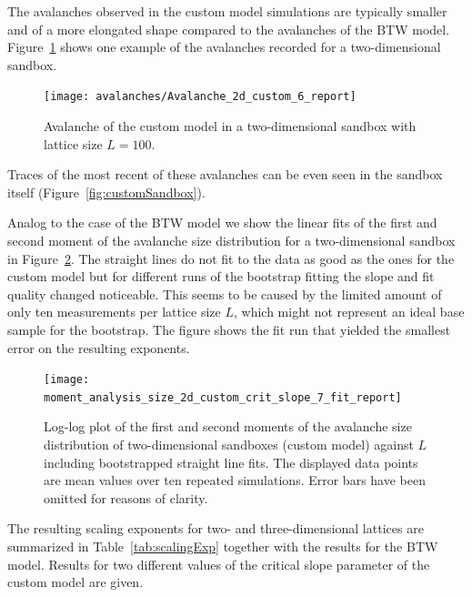 The avalanches observed in the custom model simulations are typically smaller and of a more elongated shape compared
to the avalanches of the BTW model. Figure~\ref{fig:custom2DAvalanche} shows one example of the avalanches recorded
for a two-dimensional sandbox.
\begin{figure}[htb]
    \centering
    \texttt{[image: avalanches/Avalanche\_2d\_custom\_6\_report]}
    \caption{Avalanche of the custom model in a two-dimensional sandbox with lattice size $L=100$.}
    \label{fig:custom2DAvalanche}
\end{figure}
Traces of the most recent of these avalanches can be even seen in the sandbox itself (Figure~\ref{fig:customSandbox}).

Analog to the case of the BTW model we show the linear fits of the first and second moment of the avalanche size
distribution for a two-dimensional sandbox in Figure~\ref{fig:customSizeFit}.
The straight lines do not fit to the data as good as the ones for the custom model but for different runs of the
bootstrap fitting the slope and fit quality changed noticeable. This seems to be caused by the limited amount of only
ten measurements per lattice size $L$, which might not represent an ideal base sample for the bootstrap.
The figure shows the fit run that yielded the smallest error on the resulting exponents.
\begin{figure}[htb]
    \centering
    \texttt{[image: moment\_analysis\_size\_2d\_custom\_crit\_slope\_7\_fit\_report]}
    \caption{Log-log plot of the first and second moments of the avalanche size distribution of two-dimensional
             sandboxes (custom model) against $L$ including bootstrapped straight line fits.
             The displayed data points are mean values over ten repeated simulations.
             Error bars have been omitted for reasons of clarity.}
    \label{fig:customSizeFit}
\end{figure}

The resulting scaling exponents for two- and three-dimensional lattices are summarized in Table~\ref{tab:scalingExp}
together with the results for the BTW model. Results for two different values of the critical slope parameter of the
custom model are given.

